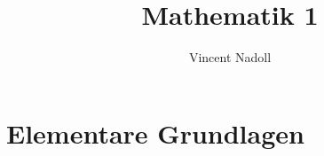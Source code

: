 \documentclass{scrreprt}
\title{Mathematik 1}
\author{Vincent Nadoll}
\begin{document}
\maketitle
\tableofcontents

\chapter{Elementare Grundlagen}

\end{document}
